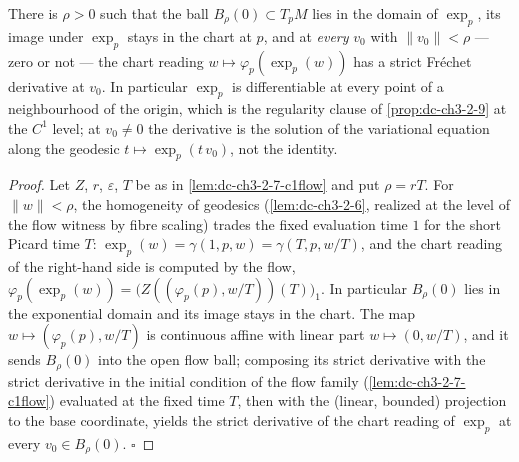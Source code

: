 \begin{lemma}
  \label{lem:dc-ch3-2-9-c1ball}
  \leanok
  There is $\rho > 0$ such that the ball $B_\rho(0) \subset T_pM$ lies in the
  domain of $\exp_p$, its image under $\exp_p$ stays in the chart at $p$, and
  at \emph{every} $v_0$ with $\|v_0\| < \rho$ — zero or not — the chart
  reading $w \mapsto \varphi_p(\exp_p(w))$ has a strict Fr\'echet derivative
  at $v_0$. In particular $\exp_p$ is differentiable at every point of a
  neighbourhood of the origin, which is the regularity clause of
  \cref{prop:dc-ch3-2-9} at the $C^1$ level; at $v_0 \ne 0$ the derivative is
  the solution of the variational equation along the geodesic
  $t \mapsto \exp_p(t\,v_0)$, not the identity.
\end{lemma}
\begin{proof}
  \leanok
  Let $Z$, $r$, $\varepsilon$, $T$ be as in \cref{lem:dc-ch3-2-7-c1flow} and
  put $\rho = rT$. For $\|w\| < \rho$, the homogeneity of geodesics
  (\cref{lem:dc-ch3-2-6}, realized at the level of the flow witness by fibre
  scaling) trades the fixed evaluation time $1$ for the short Picard time
  $T$: $\exp_p(w) = \gamma(1, p, w) = \gamma(T, p, w/T)$, and the chart
  reading of the right-hand side is computed by the flow,
  $\varphi_p(\exp_p(w)) = \big(Z((\varphi_p(p), w/T))(T)\big)_1$. In
  particular $B_\rho(0)$ lies in the exponential domain and its image stays
  in the chart. The map $w \mapsto (\varphi_p(p), w/T)$ is continuous affine
  with linear part $w \mapsto (0, w/T)$, and it sends $B_\rho(0)$ into the
  open flow ball; composing its strict derivative with the strict derivative
  in the initial condition of the flow family (\cref{lem:dc-ch3-2-7-c1flow})
  evaluated at the fixed time $T$, then with the (linear, bounded) projection
  to the base coordinate, yields the strict derivative of the chart reading
  of $\exp_p$ at every $v_0 \in B_\rho(0)$. $\square$
\end{proof}

